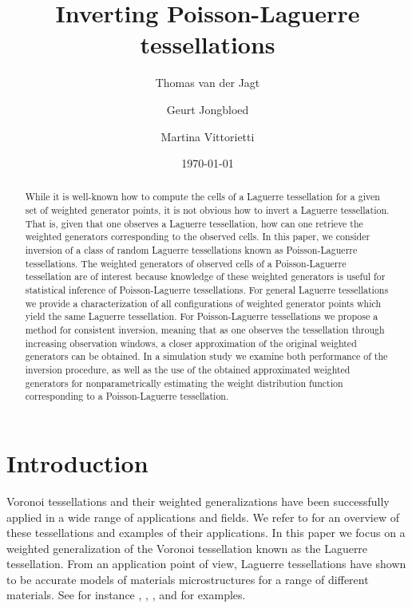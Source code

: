 \documentclass{article}
\title{Inverting Poisson-Laguerre tessellations}
\author{Thomas van der Jagt}
\author{Geurt Jongbloed}
\author{Martina Vittorietti}
\affil{Delft Institute of Applied Mathematics, Delft University of Technology.}
\date{\today}
\theoremstyle{plain}
\theoremstyle{remark}
\theoremstyle{definition}
\begin{document}
\maketitle

\begin{abstract}
    While it is well-known how to compute the cells of a Laguerre tessellation for a given set of weighted generator points, it is not obvious how to invert a Laguerre tessellation. That is, given that one observes a Laguerre tessellation, how can one retrieve the weighted generators corresponding to the observed cells. In this paper, we consider inversion of a class of random Laguerre tessellations known as Poisson-Laguerre tessellations. The weighted generators of observed cells of a Poisson-Laguerre tessellation are of interest because knowledge of these weighted generators is useful for statistical inference of Poisson-Laguerre tessellations. For general Laguerre tessellations we provide a characterization of all configurations of weighted generator points which yield the same Laguerre tessellation. For Poisson-Laguerre tessellations we propose a method for consistent inversion, meaning that as one observes the tessellation through increasing observation windows, a closer approximation of the original weighted generators can be obtained. In a simulation study we examine both performance of the inversion procedure, as well as the use of the obtained approximated weighted generators for nonparametrically estimating the weight distribution function corresponding to a Poisson-Laguerre tessellation. 
\end{abstract}


\section{Introduction}
Voronoi tessellations and their weighted generalizations have been successfully applied in a wide range of applications and fields. We refer to \cite{Okabe2000,Redenbach2025} for an overview of these tessellations and examples of their applications. In this paper we focus on a weighted generalization of the Voronoi tessellation known as the Laguerre tessellation. From an application point of view, Laguerre tessellations have shown to be accurate models of materials microstructures for a range of different materials. See for instance \cite{Falco2017}, \cite{Lautensack2008b}, \cite{Liebscher2015},  and \cite{Wu2010} for examples.
\end{document}
